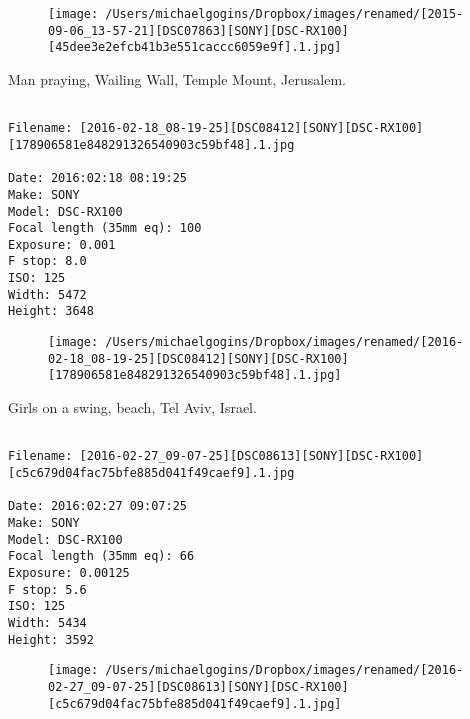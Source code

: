 \documentclass[11pt,letter,DIV=14,paper=landscape]{scrbook}
\begin{document}
\begin{figure}
\texttt{[image: /Users/michaelgogins/Dropbox/images/renamed/[2015-09-06\_13-57-21][DSC07863][SONY][DSC-RX100][45dee3e2efcb41b3e551caccc6059e9f].1.jpg]}
\end{figure}
    
\clearpage
\noindent Man praying, Wailing Wall, Temple Mount, Jerusalem.
\noindent
\begin{lstlisting}

Filename: [2016-02-18_08-19-25][DSC08412][SONY][DSC-RX100][178906581e848291326540903c59bf48].1.jpg

Date: 2016:02:18 08:19:25
Make: SONY
Model: DSC-RX100
Focal length (35mm eq): 100
Exposure: 0.001
F stop: 8.0
ISO: 125
Width: 5472
Height: 3648
\end{lstlisting}
\clearpage

\begin{figure}
\texttt{[image: /Users/michaelgogins/Dropbox/images/renamed/[2016-02-18\_08-19-25][DSC08412][SONY][DSC-RX100][178906581e848291326540903c59bf48].1.jpg]}
\end{figure}
    
\clearpage
\noindent Girls on a swing, beach, Tel Aviv, Israel.
\noindent
\begin{lstlisting}

Filename: [2016-02-27_09-07-25][DSC08613][SONY][DSC-RX100][c5c679d04fac75bfe885d041f49caef9].1.jpg

Date: 2016:02:27 09:07:25
Make: SONY
Model: DSC-RX100
Focal length (35mm eq): 66
Exposure: 0.00125
F stop: 5.6
ISO: 125
Width: 5434
Height: 3592
\end{lstlisting}
\clearpage

\begin{figure}
\texttt{[image: /Users/michaelgogins/Dropbox/images/renamed/[2016-02-27\_09-07-25][DSC08613][SONY][DSC-RX100][c5c679d04fac75bfe885d041f49caef9].1.jpg]}
\end{figure}
    
\end{document}
